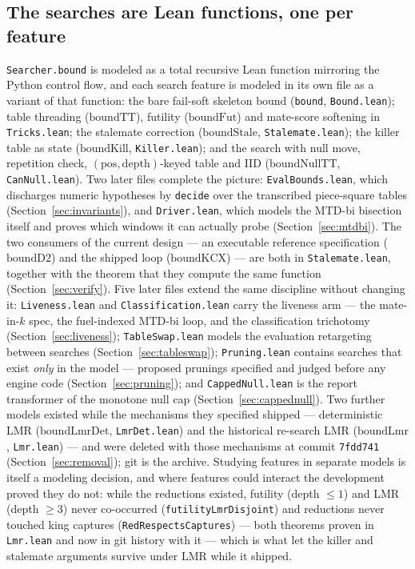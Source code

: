 \documentclass[11pt]{article}
\newcommand{\leanref}[2]{(\texttt{#1}, \texttt{#2})}%
\theoremstyle{plain}
\theoremstyle{definition}
\theoremstyle{remark}
\begin{document}
\subsection{The searches are Lean functions, one per feature}
\label{sec:model-searches}

\texttt{Searcher.bound} is modeled as a total recursive Lean function
mirroring the Python control flow, and each search feature is modeled in
its own file as a variant of that function: the bare fail-soft skeleton
$\mathrm{bound}$ \leanref{bound}{Bound.lean}; table threading
($\mathrm{boundTT}$), futility ($\mathrm{boundFut}$) and mate-score
softening in \texttt{Tricks.lean}; the stalemate correction
($\mathrm{boundStale}$, \texttt{Stalemate.lean}); the killer table as
state ($\mathrm{boundKill}$, \texttt{Killer.lean}); and the
search with null move, repetition check, $(\mathrm{pos},
\mathrm{depth})$-keyed table and IID ($\mathrm{boundNullTT}$,
\texttt{CanNull.lean}).  Two later files complete the picture:
\texttt{EvalBounds.lean}, which discharges numeric hypotheses by
\texttt{decide} over the transcribed piece-square tables
(Section~\ref{sec:invariants}), and \texttt{Driver.lean}, which models
the MTD-bi bisection itself and proves which windows it can actually
probe (Section~\ref{sec:mtdbi}).  The two consumers of the current
design --- an executable reference specification ($\mathrm{boundD2}$)
and the shipped loop ($\mathrm{boundKCX}$) --- are both in
\texttt{Stalemate.lean}, together with the theorem that they compute
the same function (Section~\ref{sec:verify}).  Five later files extend
the same discipline without changing it: \texttt{Liveness.lean} and
\texttt{Classification.lean} carry the liveness arm --- the mate-in-$k$
spec, the fuel-indexed MTD-bi loop, and the classification trichotomy
(Section~\ref{sec:liveness}); \texttt{TableSwap.lean} models the
evaluation retargeting between searches
(Section~\ref{sec:tableswap}); \texttt{Pruning.lean} contains
searches that exist \emph{only} in the model --- proposed prunings
specified and judged before any engine code
(Section~\ref{sec:pruning}); and \texttt{CappedNull.lean} is the
report transformer of the monotone null cap
(Section~\ref{sec:cappednull}).  Two
further models existed while the mechanisms they specified shipped ---
deterministic LMR ($\mathrm{boundLmrDet}$, \texttt{LmrDet.lean}) and
the historical re-search LMR ($\mathrm{boundLmr}$, \texttt{Lmr.lean})
--- and were deleted with those mechanisms at commit \texttt{7fdd741}
(Section~\ref{sec:removal}); git is the archive.  Studying
features in separate models is itself a modeling decision, and where
features could interact the development proved they do not: while the
reductions existed, futility (depth $\le 1$) and LMR (depth $\ge 3$)
never co-occurred (\texttt{futilityLmrDisjoint}) and reductions never
touched king captures (\texttt{RedRespectsCaptures}) --- both theorems
proven in \texttt{Lmr.lean} and now in git history with it --- which is
what let the killer and stalemate arguments survive under LMR while it
shipped.
\end{document}
